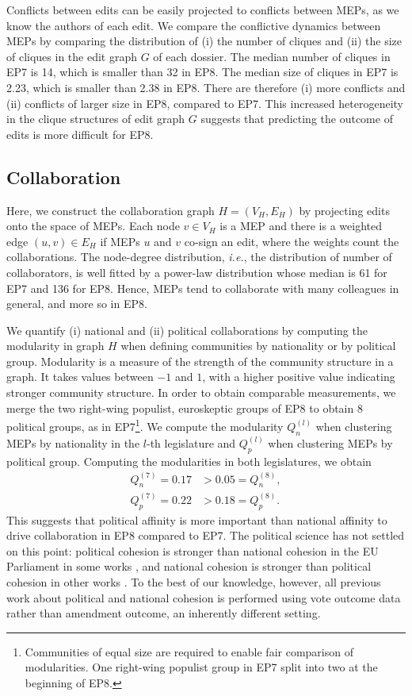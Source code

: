Conflicts between edits can be easily projected to conflicts between MEPs, as we know the authors of each edit.
We compare the conflictive dynamics between MEPs by comparing the distribution of (i) the number of cliques and (ii) the size of cliques in the edit graph $G$ of each dossier.
The median number of cliques in EP7 is 14, which is smaller than 32 in EP8.
The median size of cliques in EP7 is 2.23, which is smaller than 2.38 in EP8.
There are therefore (i) more conflicts and (ii) conflicts of larger size in EP8, compared to EP7.
This increased heterogeneity in the clique structures of edit graph $G$ suggests that predicting the outcome of edits is more difficult for EP8.

\subsection{Collaboration}

Here, we construct the collaboration graph $ H = (V_H, E_H) $ by projecting edits onto the space of MEPs.
Each node $ v \in V_H $ is a MEP and there is a weighted edge $ (u, v) \in E_H $ if MEPs $u$ and $v$ co-sign an edit, where the weights count the collaborations.
The node-degree distribution, \textit{i.e.}, the distribution of number of collaborators, is well fitted by a power-law distribution whose median is 61 for EP7 and 136 for EP8.
Hence, MEPs tend to collaborate with many colleagues in general, and more so in EP8.

We quantify (i) national and (ii) political collaborations by computing the modularity \cite{newman2006modularity} in graph $H$ when defining communities by nationality or by political group.
Modularity is a measure of the strength of the community structure in a graph.
It takes values between $-1$ and $1$, with a higher positive value indicating stronger community structure.
In order to obtain comparable measurements, we merge the two right-wing populist, euroskeptic groups of EP8 to obtain 8 political groups, as in EP7\footnote{Communities of equal size are required to enable fair comparison of modularities. One right-wing populist group in EP7 split into two at the beginning of EP8.}.
We compute the modularity $ Q_n^{(l)} $ when clustering MEPs by nationality in the $l$-th legislature and $ Q_p^{(l)} $ when clustering MEPs by political group.
Computing the modularities in both legislatures, we obtain
\begin{align*}
  Q_n^{(7)} = 0.17  &>  0.05 = Q_n^{(8)}, \\
  Q_p^{(7)} = 0.22  &>  0.18 = Q_p^{(8)}.
\end{align*}
This suggests that political affinity is more important than national affinity to drive collaboration in EP8 compared to EP7.
The political science has not settled on this point: political cohesion is stronger than national cohesion in the EU Parliament in some works \cite{hix2002parliamentary,hix2008voting,mcelroy2010party}, and national cohesion is stronger than political cohesion in other works \cite{cicchi2013logic,hix2013empowerment,cencig2017voting}.
To the best of our knowledge, however, all previous work about political and national cohesion is performed using vote outcome data rather than amendment outcome, an inherently different setting.

